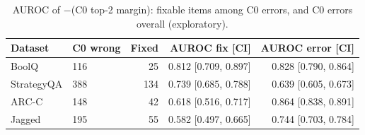 \begin{table}[h!]
\centering
\small
\caption{AUROC of $-$(C0 top-2 margin): fixable items among C0 errors, and C0 errors overall (exploratory).}
\label{tab:margin_auroc}
\begin{tabular}{llrrr}
\toprule
Dataset & C0 wrong & Fixed & AUROC fix [CI] & AUROC error [CI] \\
\midrule
BoolQ & 116 & 25 & 0.812 [0.709, 0.897] & 0.828 [0.790, 0.864] \\
StrategyQA & 388 & 134 & 0.739 [0.685, 0.788] & 0.639 [0.605, 0.673] \\
ARC-C & 148 & 42 & 0.618 [0.516, 0.717] & 0.864 [0.838, 0.891] \\
Jagged & 195 & 55 & 0.582 [0.497, 0.665] & 0.744 [0.703, 0.784] \\
\bottomrule
\end{tabular}
\end{table}
